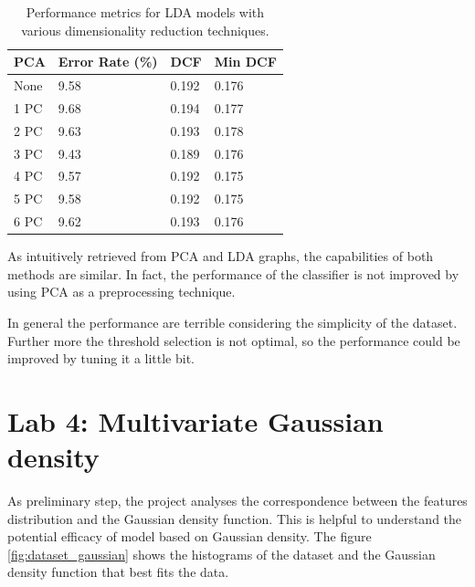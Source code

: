 \documentclass{article}
\begin{document}
\begin{table}[ht!]
    \centering
    \begin{tabularx}{\textwidth}{lXXX}
        \toprule
        \textbf{PCA} & \textbf{Error Rate (\%)} & \textbf{DCF} & \textbf{Min DCF} \\
        \midrule
        None   & 9.58 & 0.192 & 0.176 \\
        1 PC  & 9.68 & 0.194 & 0.177 \\
        2 PC  & 9.63 & 0.193 & 0.178 \\
        3 PC  & 9.43 & 0.189 & 0.176 \\
        4 PC  & 9.57 & 0.192 & 0.175 \\
        5 PC  & 9.58 & 0.192 & 0.175 \\
        6 PC  & 9.62 & 0.193 & 0.176 \\
        \bottomrule
    \end{tabularx}
    \caption{Performance metrics for LDA models with various dimensionality reduction techniques.}
    \label{tab:lda_performance}
\end{table}

As intuitively retrieved from PCA and LDA graphs, the capabilities of both methods are similar. In fact, the performance of the classifier is not improved by using PCA as a preprocessing technique. 

In general the performance are terrible considering the simplicity of the dataset. Further more the threshold selection is not optimal, so the performance could be improved by tuning it a little bit.

\section{Lab 4: Multivariate Gaussian density}
\label{sec:gaussian_density}
As preliminary step, the project analyses the correspondence between the features distribution and the Gaussian density function. This is helpful to understand the potential efficacy of model based on Gaussian density.
The figure \ref{fig:dataset_gaussian} shows the histograms of the dataset and the Gaussian density function that best fits the data.
\end{document}

